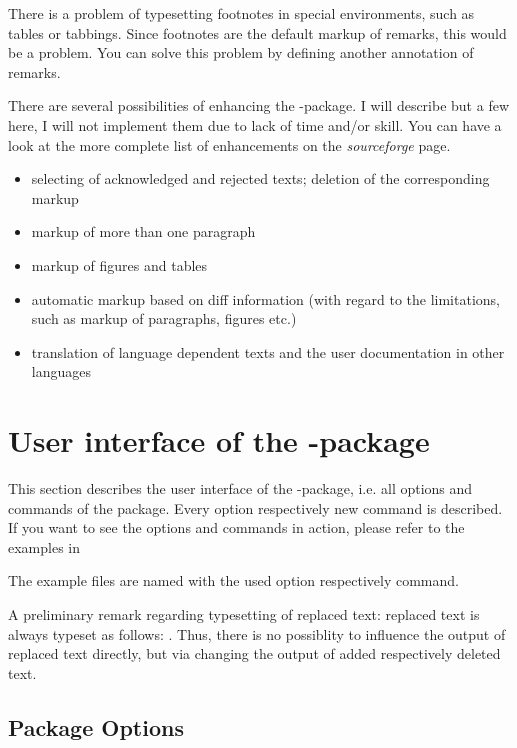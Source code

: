 There is a problem of typesetting footnotes in special environments, such as tables or tabbings.
Since footnotes are the default markup of remarks, this would be a problem.
You can solve this problem by defining another annotation of remarks.

There are several possibilities of enhancing the -package.
I will describe but a few here, I will not implement them due to lack of time and/or skill.
You can have a look at the more complete list of enhancements on the \emph{sourceforge} page.

\begin{itemize}
	\item selecting of acknowledged and rejected texts; deletion of the corresponding markup
	\item markup of more than one paragraph
	\item markup of figures and tables
	\item automatic markup based on diff information (with regard to the limitations, such as markup of paragraphs, figures etc.)
	\item translation of language dependent texts and the user documentation in other languages
\end{itemize}


\section{User interface of the -package}
\label{sec:user}

This section describes the user interface of the -package, i.e. all options and commands of the package.
Every option respectively new command is described.
If you want to see the options and commands in action, please refer to the examples in



The example files are named with the used option respectively command.

A preliminary remark regarding typesetting of replaced text: replaced text is always typeset as follows: .
Thus, there is no possiblity to influence the output of replaced text directly, but via changing the output of added respectively deleted text.


\subsection{Package Options}
\label{sec:user:options}

